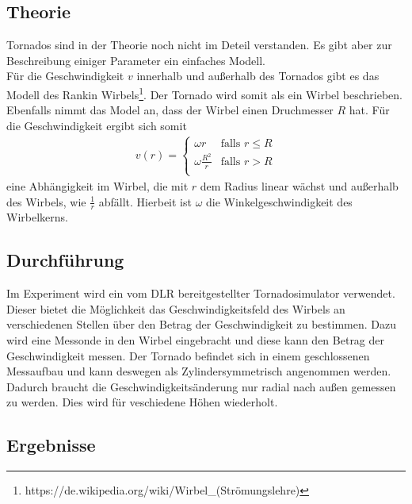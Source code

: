 \documentclass[12pt,a4paper,titlepage,headinclude]{scrartcl}
\numberwithin{equation}{subsection}
\begin{document}
\subsection{Theorie}
Tornados sind in der Theorie noch nicht im Deteil verstanden.
Es gibt aber zur Beschreibung einiger Parameter ein einfaches Modell.\\
Für die Geschwindigkeit $v$ innerhalb und außerhalb des Tornados gibt es das Modell des Rankin Wirbels\footnote{https://de.wikipedia.org/wiki/Wirbel\_(Strömungslehre)}.
Der Tornado wird somit als ein Wirbel beschrieben.
Ebenfalls nimmt das Model an, dass der Wirbel einen Druchmesser $R$ hat.
Für die Geschwindigkeit ergibt sich somit
\begin{align}
	v(r) = 
	\begin{cases}
		\omega r & \text{falls } r \leq R\\ 
		\omega \frac{R^2}{r} & \text{falls } r > R\label{eq:rw}\\
	\end{cases}
\end{align}
eine Abhängigkeit im Wirbel, die mit $r$ dem Radius linear wächst und außerhalb des Wirbels, wie $\frac{1}{r}$ abfällt.
Hierbeit ist $\omega$ die Winkelgeschwindigkeit des Wirbelkerns.


\subsection{Durchführung}
Im Experiment wird ein vom DLR bereitgestellter Tornadosimulator verwendet.
Dieser bietet die Möglichkeit das Geschwindigkeitsfeld des Wirbels an verschiedenen Stellen über den Betrag der Geschwindigkeit zu bestimmen.
Dazu wird eine Messonde in den Wirbel eingebracht und diese kann den Betrag der Geschwindigkeit messen.
Der Tornado befindet sich in einem geschlossenen Messaufbau und kann deswegen als Zylindersymmetrisch angenommen werden.
Dadurch braucht die Geschwindigkeitsänderung nur radial nach außen gemessen zu werden.
Dies wird für veschiedene Höhen wiederholt.

\subsection{Ergebnisse}
\end{document}
